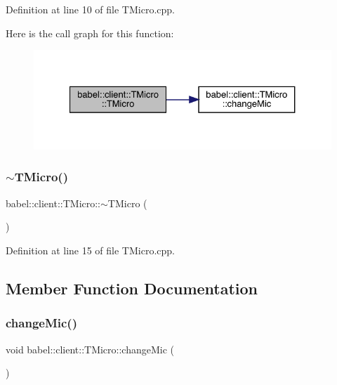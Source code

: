 Definition at line 10 of file T\+Micro.\+cpp.

Here is the call graph for this function\+:\nopagebreak
\begin{figure}[H]
\begin{center}
\leavevmode
\includegraphics[width=327pt]{classbabel_1_1client_1_1_t_micro_a5f296ce21c811f643e3ad99da0d0761d_cgraph}
\end{center}
\end{figure}
\mbox{\label{classbabel_1_1client_1_1_t_micro_a710f29833224512c0ed9a6c8503269f5}} 
\subsubsection{\texorpdfstring{$\sim$\+T\+Micro()}{~TMicro()}}
{\footnotesize\ttfamily babel\+::client\+::\+T\+Micro\+::$\sim$\+T\+Micro (\begin{DoxyParamCaption}{ }\end{DoxyParamCaption})}



Definition at line 15 of file T\+Micro.\+cpp.



\subsection{Member Function Documentation}
\mbox{\label{classbabel_1_1client_1_1_t_micro_aaf001f7264baf8b843088e44a12b6140}} 
\subsubsection{\texorpdfstring{change\+Mic()}{changeMic()}}
{\footnotesize\ttfamily void babel\+::client\+::\+T\+Micro\+::change\+Mic (\begin{DoxyParamCaption}{ }\end{DoxyParamCaption})}



